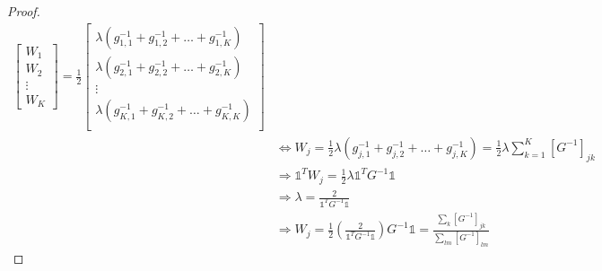 \documentclass[12pt]{article}
\newcommand{\LRA}{\Leftrightarrow}
\newcommand{\RA}{\Rightarrow}
\begin{document}
\begin{proof}
\begin{align*}
\begin{bmatrix}
			W_1 \\ W_2 \\ \vdots \\ W_K
			\end{bmatrix} = \frac{1}{2} \begin{bmatrix}
			\lambda (g_{1,1}^{-1} + g_{1,2}^{-1} + \dots + g_{1,K}^{-1})\\
			\lambda (g_{2,1}^{-1} + g_{2,2}^{-1} + \dots + g_{2,K}^{-1})\\
			\vdots  \\
			\lambda (g_{K,1}^{-1} + g_{K,2}^{-1} + \dots + g_{K,K}^{-1})\\
			\end{bmatrix} \\
			&\LRA W_j=\frac{1}{2}\lambda(g_{j,1}^{-1} + g_{j,2}^{-1} + \dots + g_{j,K}^{-1}) = \frac{1}{2}\lambda\sum_{k=1}^{K}[G^{-1}]_{jk}\\
			&\RA \mathbb{1}^T W_j = \frac{1}{2}\lambda \mathbb{1}^T G^{-1} \mathbb{1}\\
			&\RA \lambda = \frac{2}{\mathbb{1}^T G^{-1} \mathbb{1}}\\
			&\RA  W_j = \frac{1}{2}\left( \frac{2}{\mathbb{1}^T G^{-1} \mathbb{1}} \right) G^{-1} \mathbb{1} = \frac{ \sum_k [ G^{-1} ]_{jk} }{ \sum_{lm} [ G^{-1} ]_{lm} }
		\end{align*}
	\end{proof}
	
	
\end{document}
